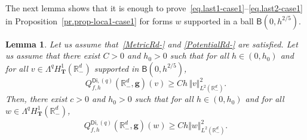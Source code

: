 \documentclass[JEP,XML,SOM,Unicode,NoEqCountersInSection,NoFloatCountersInSection,published]{cedram}
\newcommand{\mbf}[1]{\mathbf{#1}}
\theoremstyle{plain}
\newtheorem{lemma}[proposition]{Lemma}
\theoremstyle{definition}
\begin{document}
The next lemma shows that it is enough to
prove~\eqref{eq.last1-case1}--\eqref{eq.last2-case1} in
Proposition~\ref{pr.prop-loca1-case1} for forms $w$ supported in a
ball $\mathsf B(0,h^{2/5})$.
\begin{lemma}\label{le.IMS-loca}
Let us assume that~\ref{MetricRd-} and \ref{PotentialRd-} are
satisfied. Let us assume that there exist $C>0$ and $h_0>0$ such
that for all $h\in (0,h_0)$ and for all $v\in \Lambda^q H^1_{\mbf T}(\mathbb R^d_-)$ supported in $\mathsf B(0,h^{2/5})$,
\begin{equation}\label{eq.cond1Q}
Q_{f,h}^{\mathsf{Di},(q)}(\mathbb R^d_-,\mbf g)(v)\ge Ch\, \Vert v \Vert_{L^2(\mathbb R^d_-)}^2.
\end{equation}
Then, there exist $c>0$ and $h_0>0$ such that for all $h\in
(0,h_0)$ and for all $w\in \Lambda^q H^1_{\mbf T}(\mathbb R^d_-)$,
\begin{align*}
Q_{f,h}^{\mathsf{Di},(q)}(\mathbb R^d_-,\mbf g)(w)\ge Ch \Vert w \Vert_{L^2(\mathbb R_-^d)}^2.
\end{align*}
\end{lemma}
\end{document}
